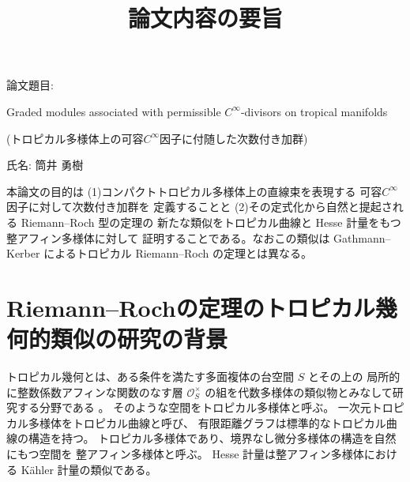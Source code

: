 \documentclass[uplatex,dvipdfmx,12pt]{jsarticle}
\title{論文内容の要旨
}
\date{}
\numberwithin{equation}{section}
\theoremstyle{definition}
\newcommand{\beforesection}{\vspace{-15pt}}
\newcommand{\aftersection}{\vspace{-8pt}}
\begin{document}
\setlength{\baselineskip}{-5pt}
\setlength{\parskip}{2pt}


\maketitle
{\large
\noindent
論文題目:

Graded modules associated 
with permissible $C^{\infty}$-divisors on tropical manifolds

(トロピカル多様体上の可容$C^{\infty}$因子に付随した次数付き加群)
}

\vspace{5pt}

\noindent
{\large
氏名: 筒井 勇樹
}

\vspace{10pt}

\setlength{\baselineskip}{4pt}
\setlength{\parskip}{3pt}

本論文の目的は
(1)コンパクトトロピカル多様体上の直線束を表現する
可容$C^{\infty}$因子に対して次数付き加群を
定義することと
(2)その定式化から自然と提起される Riemann--Roch 型の定理の
新たな類似をトロピカル曲線と Hesse 計量をもつ整アフィン多様体に対して
証明することである。なおこの類似は Gathmann--Kerber
によるトロピカル Riemann--Roch の定理とは異なる。

\beforesection

\section{Riemann--Rochの定理のトロピカル幾何的類似の研究の背景}

\aftersection

トロピカル幾何とは、ある条件を満たす多面複体の台空間 $S$ とその上の
局所的に整数係数アフィンな関数のなす層 
$\mathcal{O}_S^{\times}$
の組を代数多様体の類似物とみなして研究する分野である
\cite{mikhalkinTropicalEigenwaveIntermediate2014a,
gross2019sheaftheoretic}。
そのような空間をトロピカル多様体と呼ぶ。
一次元トロピカル多様体をトロピカル曲線と呼び、
有限距離グラフは標準的なトロピカル曲線の構造を持つ。
トロピカル多様体であり、境界なし微分多様体の構造を自然にもつ空間を
整アフィン多様体と呼ぶ。
Hesse 計量は整アフィン多様体における
K\"ahler 計量の類似である。
\end{document}
